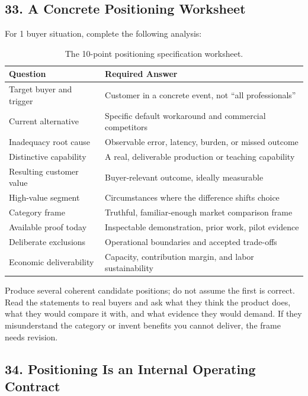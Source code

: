 \subsection*{33. A Concrete Positioning Worksheet}

For 1 buyer situation, complete the following analysis:

\begin{table}[htbp]
\centering
\small
\begin{tabularx}{\columnwidth}{>{\raggedright\arraybackslash}p{3.2cm} >{\raggedright\arraybackslash}X}
\toprule
\textbf{Question} & \textbf{Required Answer} \\
\midrule
Target buyer and trigger & Customer in a concrete event, not ``all professionals'' \\
Current alternative & Specific default workaround and commercial competitors \\
Inadequacy root cause & Observable error, latency, burden, or missed outcome \\
Distinctive capability & A real, deliverable production or teaching capability \\
Resulting customer value & Buyer-relevant outcome, ideally measurable \\
High-value segment & Circumstances where the difference shifts choice \\
Category frame & Truthful, familiar-enough market comparison frame \\
Available proof today & Inspectable demonstration, prior work, pilot evidence \\
Deliberate exclusions & Operational boundaries and accepted trade-offs \\
Economic deliverability & Capacity, contribution margin, and labor sustainability \\
\bottomrule
\end{tabularx}
\caption{The 10-point positioning specification worksheet.}
\label{tab:ch8-positioning-worksheet}
\end{table}

Produce several coherent candidate positions; do not assume the first is correct. Read the statements to real buyers and ask what they think the product does, what they would compare it with, and what evidence they would demand. If they misunderstand the category or invent benefits you cannot deliver, the frame needs revision.

\subsection*{34. Positioning Is an Internal Operating Contract}

